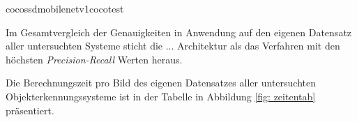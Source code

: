 



cocossdmobilenetv1cocotest

Im Gesamtvergleich der Genauigkeiten in Anwendung auf den eigenen Datensatz aller untersuchten Systeme sticht die ... Architektur als das Verfahren mit den höchsten \textit{Precision-Recall} Werten heraus. 



Die Berechnungszeit pro Bild des eigenen Datensatzes aller untersuchten Objekterkennungssysteme ist in der Tabelle in Abbildung \ref{fig: zeitentab} präsentiert. 




